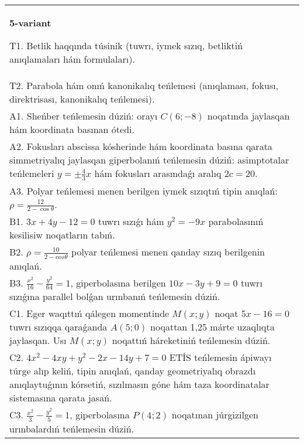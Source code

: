 \documentclass{article}
\begin{document}
\begin{tabular}{m{17cm}}
\textbf{5-variant}
\newline

T1. Betlik haqqında túsinik (tuwrı, iymek sızıq, betliktiń anıqlamaları hám formulaları).\\

T2. Parabola hám onıń kanonikalıq teńlemesi (anıqlaması, fokusı, direktrisası, kanonikalıq teńlemesi).\\

A1. Sheńber teńlemesin dúziń: orayı $C (6 ;-8) $ noqatında jaylasqan hám koordinata basınan ótedi.\\

A2. Fokusları abscissa kósherinde hám koordinata basına qarata simmetriyalıq jaylasqan giperbolanıń teńlemesin dúziń: asimptotalar teńlemeleri $y=\pm \frac{4}{3}x$ hám fokusları arasındaǵı aralıq $2 c=20$.\\

A3. Polyar teńlemesi menen berilgen iymek sızıqtıń tipin anıqlań: $\rho=\frac{12}{2-\cos\theta}$.\\

B1. $3x + 4y - 12 = 0$ tuwrı sızıǵı hám $y^{2} = - 9x$ parabolasınıń kesilisiw noqatların tabıń.  \\

B2. $\rho = \frac{10}{2 - cos\theta}$ polyar teńlemesi menen qanday sızıq berilgenin anıqlań.  \\

B3. $\frac{x^{2}}{16} - \frac{y^{2}}{64} = 1$, giperbolasına berilgen $10x - 3y + 9 = 0$ tuwrı sızıǵına parallel bolǵan urınbanıń teńlemesin dúziń.  \\

C1. Eger waqıttıń qálegen momentinde $M(x;y)$ noqat $5x - 16 = 0$ tuwrı sızıqqa qaraǵanda $A(5;0)$ noqattan 1,25 márte uzaqlıqta jaylasqan. Usı $M(x;y)$ noqattıń háreketiniń teńlemesin dúziń.  \\

C2. $4x^{2} - 4xy + y^{2} - 2x - 14y + 7 = 0$ ETİS teńlemesin ápiwayı túrge alıp keliń, tipin anıqlań, qanday geometriyalıq obrazdı anıqlaytuǵının kórsetiń, sızılmasın góne hám taza koordinatalar sistemasına qarata jasań.  \\

C3. $\frac{x^{2}}{3} - \frac{y^{2}}{5} = 1$, giperbolasına $P(4;2)$ noqatınan júrgizilgen urınbalardıń teńlemesin dúziń.  \\

\end{tabular}
\vspace{1cm}
\end{document}
